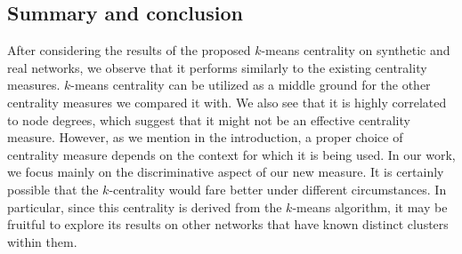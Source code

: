 \documentclass[10pt]{siamltex}
\begin{document}
\begin{pagewiselinenumbers}
\section{Summary and conclusion}  \label{sec:conclusion}
After considering the results of the proposed $k$-means centrality on synthetic and real networks, we observe that it performs similarly to the existing centrality measures. $k$-means centrality can be utilized as a middle ground for the other centrality measures we compared it with. We also see that it is highly correlated to node degrees, which suggest that it might not be an effective centrality measure. However, as we mention in the introduction, a proper choice of centrality measure depends on the context for which it is being used. In our work, we focus mainly on the discriminative aspect of our new measure. It is certainly possible that the $k$-centrality would fare better under different circumstances. In particular, since this centrality is derived from the $k$-means algorithm, it may be fruitful to explore its results on other networks that have known distinct clusters within them.
\newpage





\end{pagewiselinenumbers}
\end{document}
